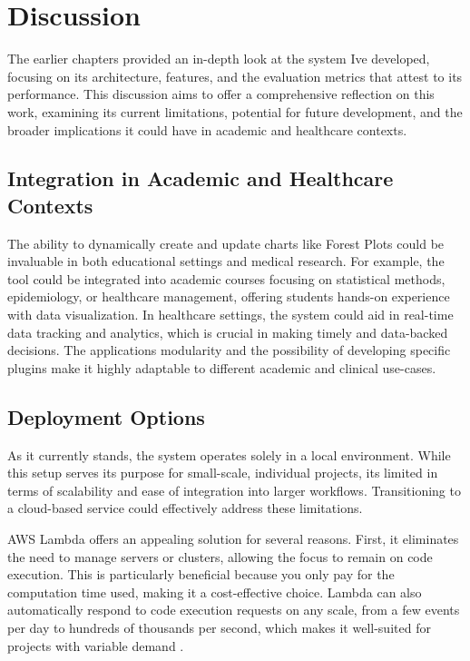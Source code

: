 \chapter{Discussion}\label{discussion}

\minitoc

The earlier chapters provided an in-depth look at the system
I\textquotesingle ve developed, focusing on its architecture, features,
and the evaluation metrics that attest to its performance. This
discussion aims to offer a comprehensive reflection on this work,
examining its current limitations, potential for future development, and
the broader implications it could have in academic and healthcare
contexts.

\section{Integration in Academic and Healthcare
Contexts}\label{integration-in-academic-and-healthcare-contexts}

The ability to dynamically create and update
charts like Forest Plots could be invaluable in both educational
settings and medical research. For example, the tool could be integrated
into academic courses focusing on statistical methods, epidemiology, or
healthcare management, offering students hands-on experience with data
visualization. In healthcare settings, the system could aid in real-time
data tracking and analytics, which is crucial in making timely and
data-backed decisions. The application\textquotesingle s modularity and
the possibility of developing specific plugins make it highly adaptable
to different academic and clinical use-cases.

\section{Deployment Options}\label{deployment-options}

As it currently stands, the system operates solely in a local
environment. While this setup serves its purpose for small-scale,
individual projects, it\textquotesingle s limited in terms of
scalability and ease of integration into larger workflows. Transitioning
to a cloud-based service could effectively address these limitations.

AWS Lambda offers an appealing solution for several reasons. First, it
eliminates the need to manage servers or clusters, allowing the focus to
remain on code execution. This is particularly beneficial because you
only pay for the computation time used, making it a cost-effective
choice. Lambda can also automatically respond to code execution requests
on any scale, from a few events per day to hundreds of thousands per
second, which makes it well-suited for projects with variable demand
\cite{50}.

